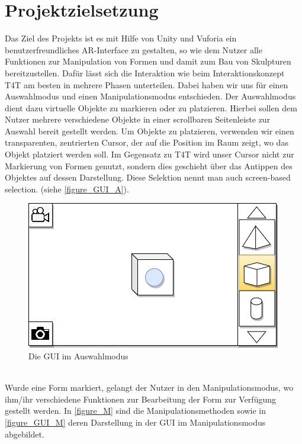 \documentclass[12pt,a4paper, oneside]{scrartcl}
\begin{document}



\newpage




\section{Projektzielsetzung}
Das Ziel des Projekts ist es mit Hilfe von Unity und Vuforia ein benutzerfreundliches AR-Interface zu gestalten, so wie dem Nutzer alle Funktionen zur Manipulation von Formen und damit zum Bau von Skulpturen bereitzustellen.
Dafür lässt sich die Interaktion wie beim Interaktionskonzept T4T am besten in mehrere Phasen unterteilen. Dabei haben wir uns für einen Auswahlmodus und einen Manipulationsmodus entschieden. Der Auswahlmodus dient dazu virtuelle Objekte zu markieren oder zu platzieren. Hierbei sollen dem Nutzer mehrere verschiedene Objekte in einer scrollbaren Seitenleiste zur Auswahl bereit gestellt werden. Um Objekte zu platzieren, verwenden wir einen transparenten, zentrierten Cursor, der auf die Position im Raum zeigt, wo das Objekt platziert werden soll. Im Gegensatz zu T4T wird unser Cursor nicht zur Markierung von Formen genutzt, sondern dies geschieht über das Antippen des Objektes auf dessen Darstellung. Diese Selektion nennt man auch screen-based selection. (siehe \autoref{figure_GUI_A}).
\begin{figure}[h!]
\centering
\includegraphics[scale=0.4]{GUIAuswahlmodus}
\caption{Die GUI im Auswahlmodus}
\label{figure_GUI_A}
\end{figure}
%
\\
%
Wurde eine Form markiert, gelangt der Nutzer in den Manipulationsmodus, wo ihm/ihr verschiedene Funktionen zur Bearbeitung der Form zur Verfügung gestellt werden. In \autoref{figure_M} sind die Manipulationsmethoden sowie in \autoref{figure_GUI_M} deren Darstellung in der GUI im Manipulationsmodus abgebildet.
\end{document}
